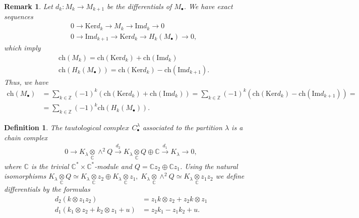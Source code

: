 \documentclass[12pt]{article}
\newtheorem{defn}{Definition}[section]
\newtheorem{rem}{Remark}[section]
\numberwithin{equation}{section}
\theoremstyle{definition}
\begin{document}
\begin{rem}\normalfont
Let $d_{k}: M_{k} \rightarrow M_{k+1}$ be the differentials of $M_{\bullet}$. We have exact sequences
\begin{align*}
    &0 \rightarrow \mathrm{Ker} d_{k} \rightarrow M_{k} \rightarrow \mathrm{Im} d_k \rightarrow 0\\
    &0 \rightarrow \mathrm{Im} d_{k+1} \rightarrow \mathrm{Ker} d_{k} \rightarrow H_{k}(M_{\bullet}) \rightarrow 0,
\end{align*}
which imply
\begin{align*}
    &\mathrm{ch}(M_{k}) = \mathrm{ch}(\mathrm{Ker} d_{k}) + \mathrm{ch}(\mathrm{Im}d_{k})\\
    &\mathrm{ch}(H_{k}(M_{\bullet})) = \mathrm{ch}(\mathrm{Ker} d_{k}) - \mathrm{ch}(\mathrm{Im}d_{k+1}).
\end{align*}
 Thus, we have
\begin{align}\label{chh}
    \mathrm{ch} ({M}_{\bullet}) &= 
    \sum\limits_{k \in \mathbb{Z}} (-1)^{k} \left( \mathrm{ch}(\mathrm{Ker} d_{k}) + \mathrm{ch}(\mathrm{Im}d_{k}) \right) 
    =\sum\limits_{k \in \mathbb{Z}} (-1)^{k} \left( \mathrm{ch}(\mathrm{Ker} d_{k}) - \mathrm{ch}(\mathrm{Im}d_{k+1}) \right) =\nonumber\\
    &=\sum\limits_{k \in \mathbb{Z}} (-1)^{k} \mathrm{ch}(H_{k}(M_{\bullet})).
\end{align}
\end{rem}
\begin{defn}\normalfont
    The $\textit{tautological complex}$ $C^{\lambda}_{\bullet}$ associated to the partition $\lambda$ is a chain complex
    \begin{align*}
    0 \longrightarrow K_{\lambda} \underset{\mathbb{C}}{\otimes} \wedge^{2} Q \stackrel{d_{2}}{\longrightarrow} K_{\lambda} \underset{\mathbb{C}}{\otimes} Q \oplus \mathbb{C} \stackrel{d_{1}}{\longrightarrow} K_{\lambda}\longrightarrow 0,
\end{align*}
where $\mathbb{C}$ is the trivial $\mathbb{C}^{*} \times \mathbb{C}^{*}$-module and $Q = \mathbb{C} z_2 \oplus \mathbb{C} z_1$.
Using the natural isomorphisms
    $K_{\lambda}  \underset{\mathbb{C}}{\otimes} Q \simeq K_{\lambda} \underset{\mathbb{C}}{\otimes} z_2 \oplus K_{\lambda} \underset{\mathbb{C}}{\otimes} z_1 ,\;
    K_{\lambda} \underset{\mathbb{C}}{\otimes} \wedge^{2} Q \simeq K_{\lambda} \underset{\mathbb{C}}{\otimes} z_1 z_2$
we define differentials by the formulas
\begin{align*}
    d_{2}(k \otimes z_1 z_2) &= z_1 k \otimes z_2 + z_2 k \otimes z_1\\
    d_{1}(k_1 \otimes z_2 + k_2 \otimes z_1 + u) &= z_2 k_1 - z_{1} k_2 + u.
\end{align*}
\end{defn}
\end{document}
